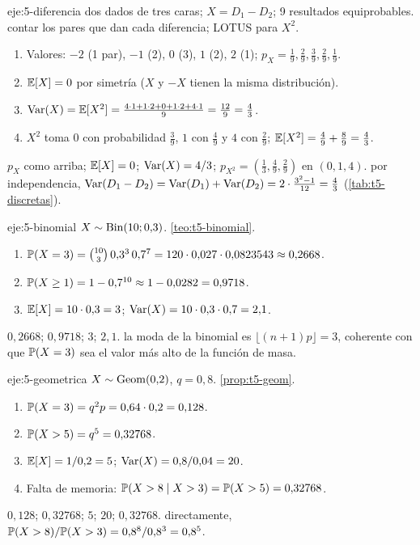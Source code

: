 \begin{solucion}{eje:5-diferencia}
\datos dos dados de tres caras; $X=D_1-D_2$; 9 resultados equiprobables.
\planteamiento contar los pares que dan cada diferencia; LOTUS para $X^{2}$.
\pasos
\begin{enumerate}[label=\arabic*.]
  \item Valores: $-2$ (1 par), $-1$ (2), $0$ (3), $1$ (2), $2$ (1); $p_X=\frac19,\frac29,\frac39,\frac29,\frac19$.
  \item $\mathbb{E}[X]=0$ por simetría ($X$ y $-X$ tienen la misma distribución).
  \item $\operatorname{Var}(X)=\mathbb{E}[X^{2}]=\frac{4\cdot1+1\cdot2+0+1\cdot2+4\cdot1}{9}=\frac{12}9=\frac43$.
  \item $X^{2}$ toma $0$ con probabilidad $\frac39$, $1$ con $\frac49$ y $4$ con $\frac29$; $\mathbb{E}[X^{2}]=\frac49+\frac89=\frac43$.
\end{enumerate}
\resultado $p_X$ como arriba; $\mathbb{E}[X]=0$; $\operatorname{Var}(X)=4/3$; $p_{X^{2}}=(\frac13,\frac49,\frac29)$ en $(0,1,4)$.
\comprobacion por independencia, $\operatorname{Var}(D_1-D_2)=\operatorname{Var}(D_1)+\operatorname{Var}(D_2)=2\cdot\frac{3^{2}-1}{12}=\frac43$ (\cref{tab:t5-discretas}).
\end{solucion}

\begin{solucion}{eje:5-binomial}
\datos $X\sim\operatorname{Bin}(10;0{,}3)$.
\planteamiento \cref{teo:t5-binomial}.
\pasos
\begin{enumerate}[label=\arabic*.]
  \item $\mathbb{P}(X=3)=\binom{10}3\,0{,}3^{3}\,0{,}7^{7}=120\cdot0{,}027\cdot0{,}0823543\approx0{,}2668$.
  \item $\mathbb{P}(X\ge1)=1-0{,}7^{10}\approx1-0{,}0282=0{,}9718$.
  \item $\mathbb{E}[X]=10\cdot0{,}3=3$; $\operatorname{Var}(X)=10\cdot0{,}3\cdot0{,}7=2{,}1$.
\end{enumerate}
\resultado $0{,}2668$; $0{,}9718$; $3$; $2{,}1$.
\comprobacion la moda de la binomial es $\lfloor(n+1)p\rfloor=3$, coherente con que $\mathbb{P}(X=3)$ sea el valor más alto de la función de masa.
\end{solucion}

\begin{solucion}{eje:5-geometrica}
\datos $X\sim\operatorname{Geom}(0{,}2)$, $q=0{,}8$.
\planteamiento \cref{prop:t5-geom}.
\pasos
\begin{enumerate}[label=\arabic*.]
  \item $\mathbb{P}(X=3)=q^{2}p=0{,}64\cdot0{,}2=0{,}128$.
  \item $\mathbb{P}(X>5)=q^{5}=0{,}32768$.
  \item $\mathbb{E}[X]=1/0{,}2=5$; $\operatorname{Var}(X)=0{,}8/0{,}04=20$.
  \item Falta de memoria: $\mathbb{P}(X>8\mid X>3)=\mathbb{P}(X>5)=0{,}32768$.
\end{enumerate}
\resultado $0{,}128$; $0{,}32768$; $5$; $20$; $0{,}32768$.
\comprobacion directamente, $\mathbb{P}(X>8)/\mathbb{P}(X>3)=0{,}8^{8}/0{,}8^{3}=0{,}8^{5}$.
\end{solucion}

